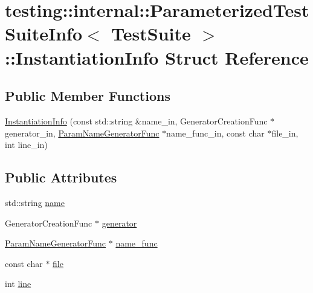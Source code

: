 \hypertarget{structtesting_1_1internal_1_1ParameterizedTestSuiteInfo_1_1InstantiationInfo}{}\section{testing\+:\+:internal\+:\+:Parameterized\+Test\+Suite\+Info$<$ Test\+Suite $>$\+:\+:Instantiation\+Info Struct Reference}
\label{structtesting_1_1internal_1_1ParameterizedTestSuiteInfo_1_1InstantiationInfo}
\subsection*{Public Member Functions}
\begin{DoxyCompactItemize}
\item 
\hyperlink{structtesting_1_1internal_1_1ParameterizedTestSuiteInfo_1_1InstantiationInfo_a1cde67cef70758ca16047040747e19c0}{Instantiation\+Info} (const std\+::string \&name\+\_\+in, Generator\+Creation\+Func $\ast$generator\+\_\+in, \hyperlink{classtesting_1_1internal_1_1ParameterizedTestSuiteInfo_a3b4f232b7d6d3df941bb8e81b6b534a4}{Param\+Name\+Generator\+Func} $\ast$name\+\_\+func\+\_\+in, const char $\ast$file\+\_\+in, int line\+\_\+in)
\end{DoxyCompactItemize}
\subsection*{Public Attributes}
\begin{DoxyCompactItemize}
\item 
std\+::string \hyperlink{structtesting_1_1internal_1_1ParameterizedTestSuiteInfo_1_1InstantiationInfo_a7e66a4d302537389c8c8efcc9acbe826}{name}
\item 
Generator\+Creation\+Func $\ast$ \hyperlink{structtesting_1_1internal_1_1ParameterizedTestSuiteInfo_1_1InstantiationInfo_a98306e8a0d25571d84821206d79629cf}{generator}
\item 
\hyperlink{classtesting_1_1internal_1_1ParameterizedTestSuiteInfo_a3b4f232b7d6d3df941bb8e81b6b534a4}{Param\+Name\+Generator\+Func} $\ast$ \hyperlink{structtesting_1_1internal_1_1ParameterizedTestSuiteInfo_1_1InstantiationInfo_a754244a7055f2d8c83b1b5e1656afe5f}{name\+\_\+func}
\item 
const char $\ast$ \hyperlink{structtesting_1_1internal_1_1ParameterizedTestSuiteInfo_1_1InstantiationInfo_ab9cb66c639c2af3dbb30afe4cf56256c}{file}
\item 
int \hyperlink{structtesting_1_1internal_1_1ParameterizedTestSuiteInfo_1_1InstantiationInfo_a95d4b9adfe5d42f66cc12214f434fa0d}{line}
\end{DoxyCompactItemize}


